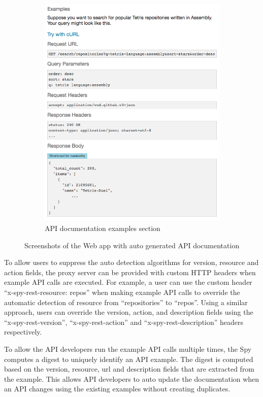 \documentclass[conference]{IEEEtran}
\begin{document}
\begin{figure}[!tbh]
\begin{subfigure}[t]{0.5\textwidth}
    \includegraphics[width=\linewidth]{spyrest_examples.png}
    \caption{API documentation examples section}
    \label{fig:examples}
  \end{subfigure}
  \caption{Screenshots of the Web app with auto generated API documentation}
  \label{fig:spyrest_screenshots}
\end{figure}

To allow users to suppress the auto detection algorithms for version, resource and action fields, the proxy server can be provided with custom HTTP headers when example API calls are executed. For example, a user can use the custom header ``x-spy-rest-resource: repos'' when making example API calls to override the automatic detection of resource from ``repositories'' to ``repos''. Using a similar approach, users can override the version, action, and description fields using the ``x-spy-rest-version'', ``x-spy-rest-action'' and ``x-spy-rest-description'' headers respectively.

To allow the API developers run the example API calls multiple times, the Spy computes a digest to uniquely identify an API example. The digest is computed based on the version, resource, url and description fields that are extracted from the example. This allows API developers to auto update the documentation when an API changes using the existing examples without creating duplicates.
\end{document}
